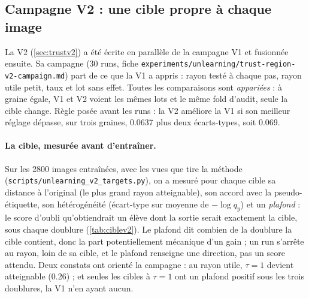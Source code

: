 \documentclass[11pt,a4paper]{article}
\newcommand{\chemin}[1]{\nolinkurl{#1}}%
\begin{document}
\subsection{Campagne V2 : une cible propre à chaque image}\label{sec:campagnev2}
La V2 (\cref{sec:trustv2}) a été écrite en parallèle de la campagne V1 et fusionnée ensuite. Sa
campagne (30 runs, fiche \chemin{experiments/unlearning/trust-region-v2-campaign.md}) part de ce que
la V1 a appris : rayon testé à chaque pas, rayon utile petit, taux et lot sans effet. Toutes les
comparaisons sont \emph{appariées} : à graine égale, V1 et V2 voient les mêmes lots et le même fold
d'audit, seule la cible change. Règle posée avant les runs : la V2 améliore la V1 si son meilleur
réglage dépasse, sur trois graines, \num{0.0637} plus deux écarts-types, soit \num{0.069}.

\paragraph{La cible, mesurée avant d'entraîner.} Sur les 2800 images entraînées, avec les vues que
tire la méthode (\chemin{scripts/unlearning\_v2\_targets.py}), on a mesuré pour chaque cible sa
distance à l'original (le plus grand rayon atteignable), son accord avec la pseudo-étiquette, son
hétérogénéité (écart-type sur moyenne de $-\log q_y$) et un \emph{plafond} : le score d'oubli
qu'obtiendrait un élève dont la sortie serait exactement la cible, sous chaque doublure
(\cref{tab:ciblev2}). Le plafond dit combien de la doublure la cible contient, donc la part
potentiellement mécanique d'un gain ; un run s'arrête au rayon, loin de sa cible, et le plafond
renseigne une direction, pas un score attendu. Deux constats ont orienté la campagne : au rayon
utile, $\tau=1$ devient atteignable (\num{0.26}) ; et seules les cibles à $\tau=1$ ont un plafond
positif sous les trois doublures, la V1 n'en ayant aucun.
\end{document}
